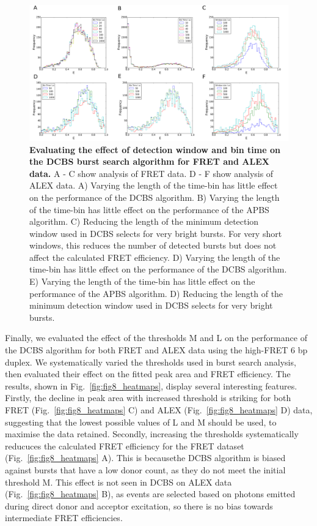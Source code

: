 \begin{figure}[!ht]
   \begin{center}
      \includegraphics*[clip=true, width=6in]{pyFRET/window_effect.pdf}
      \caption{{\bf Evaluating the effect of detection window and bin time on the DCBS burst search algorithm for FRET and ALEX data.} A - C show analysis of FRET data. D - F show analysis of ALEX data. A) Varying the length of the time-bin has little effect on the performance of the DCBS algorithm. B) Varying the length of the time-bin has little effect on the performance of the APBS algorithm. C) Reducing the length of the minimum detection window used in DCBS selects for very bright bursts. For very short windows, this reduces the number of detected bursts but does not affect the calculated FRET efficiency. D) Varying the length of the time-bin has little effect on the performance of the DCBS algorithm. E) Varying the length of the time-bin has little effect on the performance of the APBS algorithm. D) Reducing the length of the minimum detection window used in DCBS selects for very bright bursts.}
      \label{fig:fig7_binning}
   \end{center}
\end{figure}

Finally, we evaluated the effect of the thresholds M and L on the performance of the DCBS algorithm for both FRET and ALEX data using the high-FRET 6 bp duplex. We systematically varied the thresholds used in burst search analysis, then evaluated their effect on the fitted peak area and FRET efficiency. The results, shown in Fig.~\ref{fig:fig8_heatmaps}, display several interesting features. Firstly, the decline in peak area with increased threshold is striking for both FRET (Fig.~\ref{fig:fig8_heatmaps} C) and ALEX (Fig.~\ref{fig:fig8_heatmaps} D) data, suggesting that the lowest possible values of L and M should be used, to maximise the data retained. Secondly, increasing the thresholds systematically reducuces the calculated FRET efficiency for the FRET dataset (Fig.~\ref{fig:fig8_heatmaps} A). This is becausethe DCBS algorithm is biased against bursts that have a low donor count, as they do not meet the initial threshold M. This effect is not seen in DCBS on ALEX data (Fig.~\ref{fig:fig8_heatmaps} B), as events are selected based on photons emitted during direct donor and acceptor excitation, so there is no bias towards intermediate FRET efficiencies.

